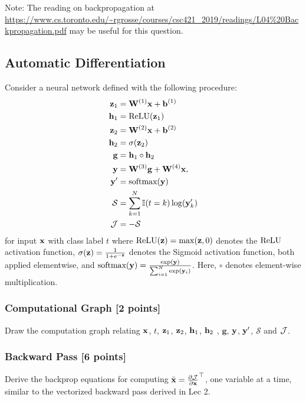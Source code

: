 \documentclass[11pt]{article}
\newcommand{\indicator}{\mathbb{I}}  %
\begin{document}
    \noindent Note: The reading on backpropagation at \url{https://www.cs.toronto.edu/~rgrosse/courses/csc421_2019/readings/L04%20Backpropagation.pdf} may be useful for this question.
    
    \subsection{Automatic Differentiation}
    Consider a neural network defined with the following procedure:
    \begin{align*}
        \intermediates_1 &= \weightMatL{1} \inputVec + \biasesL{1} \\
        \hiddens_1 &= \textnormal{ReLU}(\intermediates_1) \\
        \intermediates_2 &= \weightMatL{2} \inputVec + \biasesL{2} \\
        \hiddens_2 &= \sigma(\intermediates_2) \\
        \mathbf{g} &= \hiddens_1 \circ \hiddens_2 \\
        \predictions &=  \weightMatL{3} \mathbf{g} + \weightMatL{4} \inputVec,\\
        \predictions' &= \textnormal{softmax}(\predictions)\\ 
        \mathcal{S} &= \sum_{k=1}^{N}\indicator(t = k)\log(\predictions'_{k})\\
        \cost &= -\mathcal{S}
    \end{align*}
    for input ${\bf x}$ with class label $t$ where $\textnormal{ReLU}(\mathbf{z}) = \max(\mathbf{z}, 0)$ denotes the $\textnormal{ReLU}$ activation function, $\sigma(\mathbf{z}) = \frac{1}{1+e^{-\mathbf{z}}}$ denotes the Sigmoid activation function, both applied elementwise, and $\textnormal{softmax}(\mathbf{y}) = \frac{\exp(\mathbf{y})}{\sum_{i = 1}^{N}\exp(\mathbf{y}_i)}$.
    Here, $\circ$ denotes element-wise multiplication. 

    \subsubsection{Computational Graph {[2 points]}}
        Draw the computation graph relating ${\bf x}$, $t$, $\mathbf{z}_1$, $\mathbf{z}_2$, $\mathbf{h}_1$, $\mathbf{h}_2$ , $\mathbf{g}$, $\mathbf{y}$, $\mathbf{y}'$, $\mathcal{S}$ and $\mathcal{J}$.
    
    \subsubsection{Backward Pass {\color{blue}[6 points]}}
        Derive the backprop equations for computing $\Bar{\mathbf{x}} = {\frac{\partial \mathcal{J}}{\partial \mathbf{x}}}^{\top}$, one variable at a time, similar to the vectorized backward pass derived in Lec 2. \\
        
\end{document}

